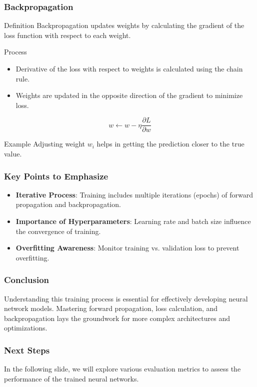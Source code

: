 \documentclass[aspectratio=169]{beamer}
\begin{document}
\begin{frame}[fragile]
    \frametitle{Backpropagation}
    \begin{block}{Definition}
        Backpropagation updates weights by calculating the gradient of the loss function with respect to each weight.
    \end{block}
    \begin{block}{Process}
        \begin{itemize}
            \item Derivative of the loss with respect to weights is calculated using the chain rule.
            \item Weights are updated in the opposite direction of the gradient to minimize loss.
        \end{itemize}
    \end{block}
    \begin{equation}
        w \gets w - \eta \frac{\partial L}{\partial w}
    \end{equation}
    \begin{block}{Example}
        Adjusting weight \( w_i \) helps in getting the prediction closer to the true value.
    \end{block}
\end{frame}

\begin{frame}[fragile]
    \frametitle{Key Points to Emphasize}
    \begin{itemize}
        \item \textbf{Iterative Process}: Training includes multiple iterations (epochs) of forward propagation and backpropagation.
        \item \textbf{Importance of Hyperparameters}: Learning rate and batch size influence the convergence of training.
        \item \textbf{Overfitting Awareness}: Monitor training vs. validation loss to prevent overfitting.
    \end{itemize}
\end{frame}

\begin{frame}[fragile]
    \frametitle{Conclusion}
    Understanding this training process is essential for effectively developing neural network models. Mastering forward propagation, loss calculation, and backpropagation lays the groundwork for more complex architectures and optimizations.
\end{frame}

\begin{frame}[fragile]
    \frametitle{Next Steps}
    In the following slide, we will explore various evaluation metrics to assess the performance of the trained neural networks.
\end{frame}
\end{document}

